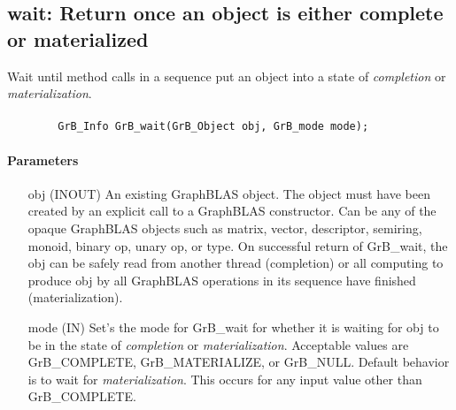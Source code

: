 \subsection{{\sf wait}: Return once an object is either complete or materialized}
\label{Sec:GrB_wait}

Wait until method calls in a sequence put an object 
into a state of \emph{completion} or \emph{materialization}.

\paragraph{\syntax}

\begin{verbatim}
        GrB_Info GrB_wait(GrB_Object obj, GrB_mode mode);
\end{verbatim}

\paragraph{Parameters}

\begin{itemize}[leftmargin=1.1in]
        \item[{\sf obj}] ({\sf INOUT}) An existing GraphBLAS object.
        The object must have been created by an explicit call to a
        GraphBLAS constructor.  Can be any of the opaque GraphBLAS
        objects such as matrix, vector, descriptor, semiring, monoid,
        binary op, unary op, or type. On successful return of {\sf
        GrB\_wait}, the {\sf obj} can be safely read from another thread (completion)
        or all computing to produce {\sf obj} by all GraphBLAS operations 
        in its sequence have finished (materialization).   
        
        \item[{\sf mode}] ({\sf IN}) Set's the mode for {\sf GrB\_wait} for whether it is waiting 
        for {\sf obj} to be in the state of \emph{completion} or \emph{materialization}.  Acceptable 
        values are {\sf GrB\_COMPLETE}, {\sf GrB\_MATERIALIZE}, or {\sf GrB\_NULL}.
        Default behavior is to wait for \emph{materialization}.  This occurs for any input
        value other than {\sf GrB\_COMPLETE}.
\end{itemize}

